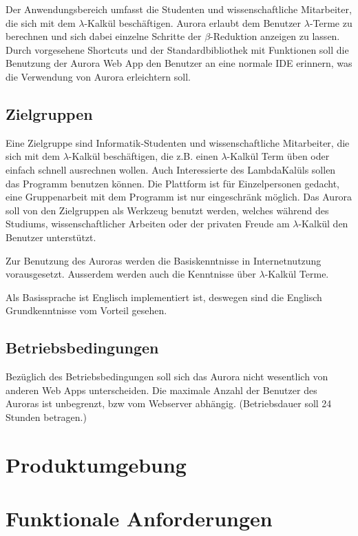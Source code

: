 \documentclass[parskip=full,11pt,twoside]{scrartcl}
\begin{document}
Der Anwendungsbereich umfasst die Studenten und wissenschaftliche Mitarbeiter, die sich mit dem $\lambda$-Kalkül beschäftigen. Aurora erlaubt dem Benutzer $\lambda$-Terme zu berechnen und sich dabei einzelne Schritte der $\beta$-Reduktion anzeigen zu lassen. Durch vorgesehene Shortcuts und der Standardbibliothek mit Funktionen soll die Benutzung  der Aurora Web App den Benutzer an eine normale IDE erinnern, was die Verwendung von Aurora erleichtern soll.

\subsection{Zielgruppen}

Eine Zielgruppe sind Informatik-Studenten und wissenschaftliche Mitarbeiter, die sich mit dem $\lambda$-Kalkül beschäftigen, die z.B. einen $\lambda$-Kalkül Term  üben oder einfach schnell ausrechnen wollen. Auch Interessierte des LambdaKalüls sollen das Programm benutzen können. Die Plattform ist für Einzelpersonen gedacht, eine Gruppenarbeit mit dem Programm ist nur eingeschränk möglich. Das Aurora soll von den Zielgruppen als Werkzeug benutzt werden, welches während des Studiums, wissenschaftlicher Arbeiten oder der privaten Freude am $\lambda$-Kalkül den Benutzer unterstützt.

Zur Benutzung des Auroras werden die Basiskenntnisse in Internetnutzung vorausgesetzt. Ausserdem werden auch die Kenntnisse über $\lambda$-Kalkül Terme.

Als Basissprache ist Englisch implementiert ist, deswegen sind die Englisch Grundkenntnisse vom Vorteil gesehen.

\subsection{Betriebsbedingungen}
Bezüglich des Betriebsbedingungen soll sich das Aurora nicht wesentlich von anderen Web Apps unterscheiden. Die maximale Anzahl der Benutzer des Auroras ist unbegrenzt, bzw vom Webserver abhängig. (Betriebsdauer soll 24 Stunden betragen.) 


\section{Produktumgebung}



\section{Funktionale Anforderungen}
\end{document}
